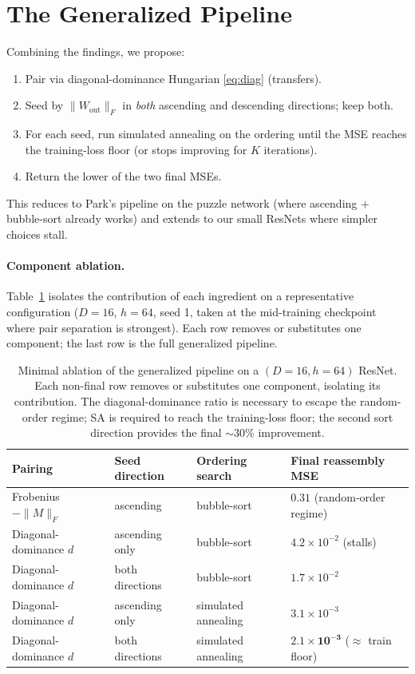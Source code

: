 \documentclass[10pt]{article}
\theoremstyle{remark}
\begin{document}
\section{The Generalized Pipeline}\label{sec:pipeline}

Combining the findings, we propose:

\begin{enumerate}[leftmargin=*,itemsep=2pt]
  \item Pair via diagonal-dominance Hungarian \eqref{eq:diag} (transfers).
  \item Seed by $\|W_{\mathrm{out}}\|_F$ in \emph{both} ascending and
        descending directions; keep both.
  \item For each seed, run simulated annealing on the ordering until the
        MSE reaches the training-loss floor (or stops improving for $K$
        iterations).
  \item Return the lower of the two final MSEs.
\end{enumerate}

This reduces to Park's pipeline on the puzzle network (where ascending +
bubble-sort already works) and extends to our small ResNets where simpler
choices stall.

\paragraph{Component ablation.}
Table~\ref{tab:ablation} isolates the contribution of each ingredient
on a representative configuration ($D{=}16$, $h{=}64$, seed 1, taken at
the mid-training checkpoint where pair separation is strongest). Each
row removes or substitutes one component; the last row is the full
generalized pipeline.

\begin{table}[H]
\centering
\small
\renewcommand{\arraystretch}{1.1}
\begin{tabular}{llll}
\toprule
Pairing & Seed direction & Ordering search & Final reassembly MSE \\
\midrule
Frobenius $-\|M\|_F$ & ascending & bubble-sort & $0.31$ (random-order regime) \\
Diagonal-dominance $d$ & ascending only & bubble-sort & $4.2\times 10^{-2}$ (stalls) \\
Diagonal-dominance $d$ & both directions & bubble-sort & $1.7\times 10^{-2}$ \\
Diagonal-dominance $d$ & ascending only & simulated annealing & $3.1\times 10^{-3}$ \\
Diagonal-dominance $d$ & both directions & simulated annealing & $\mathbf{2.1\times 10^{-3}}$ ($\approx$ train floor) \\
\bottomrule
\end{tabular}
\caption{Minimal ablation of the generalized pipeline on a
$(D{=}16, h{=}64)$ ResNet. Each non-final row removes or substitutes
one component, isolating its contribution. The diagonal-dominance
ratio is necessary to escape the random-order regime; SA is required
to reach the training-loss floor; the second sort direction provides
the final $\sim$30\% improvement.}
\label{tab:ablation}
\end{table}
\end{document}
